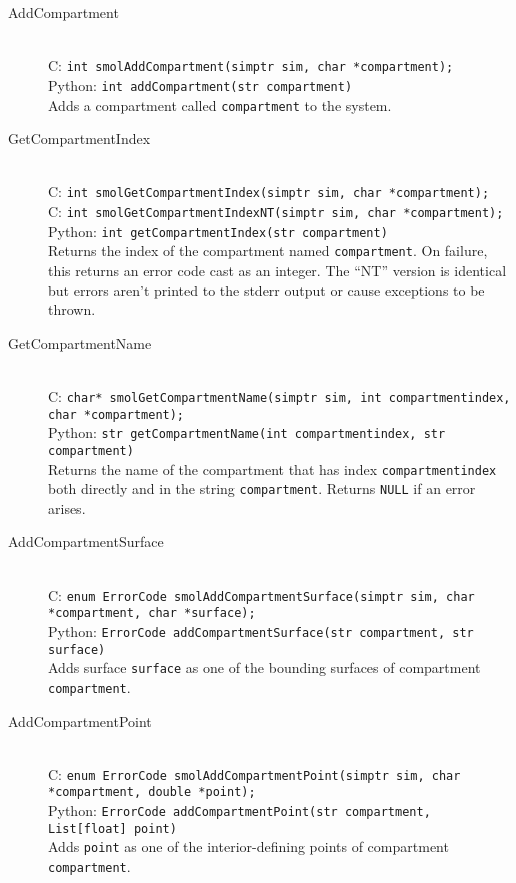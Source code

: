 \documentclass {book}
\begin{document}
\begin{description}

\item[AddCompartment]
\hfill \\
C: \texttt{int smolAddCompartment(simptr sim, char *compartment);}\\
Python: \texttt{int addCompartment(str compartment)}\\
Adds a compartment called \texttt{compartment} to the system.

\item[GetCompartmentIndex]
\hfill \\
C: \texttt{int smolGetCompartmentIndex(simptr sim, char *compartment);}\\
C: \texttt{int smolGetCompartmentIndexNT(simptr sim, char *compartment);}\\
Python: \texttt{int getCompartmentIndex(str compartment)}\\
Returns the index of the compartment named \texttt{compartment}. On failure, this returns an error code cast as an integer. The ``NT'' version is identical but errors aren't printed to the stderr output or cause exceptions to be thrown.

\item[GetCompartmentName]
\hfill \\
C: \texttt{char* smolGetCompartmentName(simptr sim, int compartmentindex, char *compartment);}\\
Python: \texttt{str getCompartmentName(int compartmentindex, str compartment)}\\
Returns the name of the compartment that has index \texttt{compartmentindex} both directly and in the string \texttt{compartment}. Returns \texttt{NULL} if an error arises.

\item[AddCompartmentSurface]
\hfill \\
C: \texttt{enum ErrorCode smolAddCompartmentSurface(simptr sim, char *compartment, char *surface);}\\
Python: \texttt{ErrorCode addCompartmentSurface(str compartment, str surface)}\\
Adds surface \texttt{surface} as one of the bounding surfaces of compartment \texttt{compartment}.

\item[AddCompartmentPoint]
\hfill \\
C: \texttt{enum ErrorCode smolAddCompartmentPoint(simptr sim, char *compartment, double *point);}\\
Python: \texttt{ErrorCode addCompartmentPoint(str compartment, List[float] point)}\\
Adds \texttt{point} as one of the interior-defining points of compartment \texttt{compartment}.


\end{description}
\end{document}
